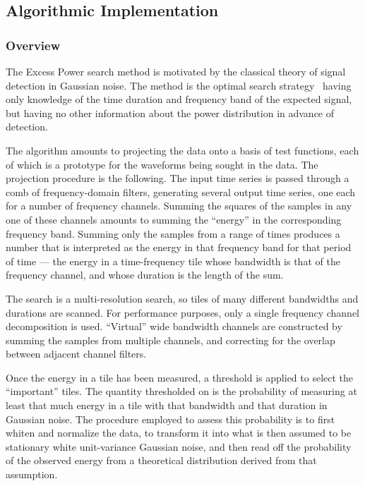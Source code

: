 \documentclass{article}
\begin{document}
\subsection{Algorithmic Implementation}


\subsubsection{Overview}


The Excess Power search method is motivated by the classical theory of
signal detection in Gaussian noise.  The method is the optimal search
strategy~\cite{Anderson:2000yy} having only knowledge of the time duration
and frequency band of the expected signal,  but having no other information
about the power distribution in advance of detection.

The algorithm amounts to projecting the data onto a basis of test
functions, each of which is a prototype for the waveforms being sought in
the data.  The projection procedure is the following.  The input time
series is passed through a comb of frequency-domain filters, generating
several output time series, one each for a number of frequency channels.
Summing the squares of the samples in any one of these channels amounts to
summing the ``energy'' in the corresponding frequency band.  Summing only
the samples from a range of times produces a number that is interpreted as
the energy in that frequency band for that period of time --- the energy in
a time-frequency tile whose bandwidth is that of the frequency channel, and
whose duration is the length of the sum.

The search is a multi-resolution search, so tiles of many different
bandwidths and durations are scanned.  For performance purposes, only a
single frequency channel decomposition is used.  ``Virtual'' wide bandwidth
channels are constructed by summing the samples from multiple channels, and
correcting for the overlap between adjacent channel filters.

Once the energy in a tile has been measured, a threshold is applied to
select the ``important'' tiles.  The quantity thresholded on is the
probability of measuring at least that much energy in a tile with that
bandwidth and that duration in Gaussian noise.  The procedure employed to
assess this probability is to first whiten and normalize the data, to
transform it into what is then assumed to be stationary white unit-variance
Gaussian noise, and then read off the probability of the observed energy
from a theoretical distribution derived from that assumption.
\end{document}
